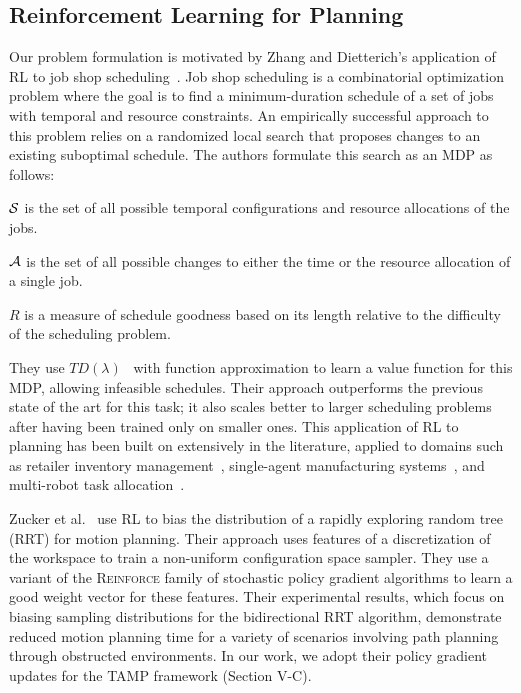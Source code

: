 \subsection{Reinforcement Learning for Planning}
Our problem formulation is motivated by Zhang and Dietterich's application of RL to job
shop scheduling~\cite{JobShopSched}. Job shop scheduling is a combinatorial optimization problem where the goal is to find
a minimum-duration schedule of a set of jobs with temporal and resource constraints. An empirically
successful approach to this problem relies on a randomized local search that proposes changes to an
existing suboptimal schedule. The authors formulate this search as an MDP as follows:
\begin{tightlist}
\item $\mathcal{S}$ is the set of all possible temporal configurations and resource allocations of the jobs.
\item $\mathcal{A}$ is the set of all possible changes to either the time or the resource allocation of a single job.
\item $R$ is a measure of schedule goodness based on its length relative to the difficulty of the scheduling problem.
\end{tightlist}
They use $TD(\lambda)$~\cite{suttonbarto} with function approximation to learn a value function
for this MDP, allowing infeasible schedules. Their approach outperforms the previous state of the art for this task;
it also scales better to larger scheduling problems after having been trained only on smaller ones.
This application of RL to planning has been built on extensively
in the literature, applied to domains such as retailer inventory
management~\cite{van1997neuro}, single-agent manufacturing systems~\cite{Wang200573}, and multi-robot
task allocation~\cite{dahl2009multi}.

Zucker et al.~\cite{workspacebias} use RL to bias the distribution of a rapidly exploring random tree (RRT)
for motion planning. Their approach uses features of a discretization of the workspace to train
a non-uniform configuration space sampler. They use a variant of the \textsc{Reinforce} family
of stochastic policy gradient algorithms to learn a good weight vector for these features.
Their experimental results, which focus on biasing sampling distributions for the bidirectional
RRT algorithm, demonstrate reduced motion planning time for a variety of scenarios involving path
planning through obstructed environments. In our work, we adopt their policy gradient updates for the TAMP framework
(Section V-C).

